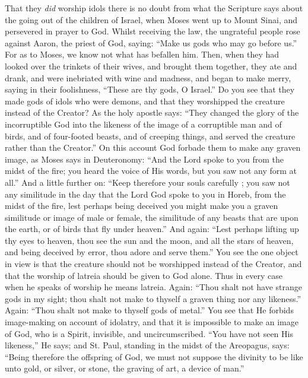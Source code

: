 \documentclass[10pt]{book}
\newcommand{\switchenglish}{\selectlanguage{english} \switchcolumn}
\begin{document}
\begin{paracol}{2}
\switchenglish

That they \emph{did} worship idols there is no 
doubt from what the Scripture says about the 
going out of the children of Israel, when Moses 
went up to Mount Sinai, and persevered in 
prayer to God. Whilst receiving the law, the 
ungrateful people rose against Aaron, the 
priest of God, saying: ``Make us gods who 
may go before us.'' For as to Moses, we know 
not what has befallen him. Then, when they 
had looked over the trinkets of their wives, and 
brought them together, they ate and drank, 
and were inebriated with wine and madness, 
and began to make merry, saying in their 
foolishness, ``These are thy gods, O Israel.''
Do you see that they made gods of idols who 
were demons, and that they worshipped the 
creature instead of the Creator? As the holy 
apostle says: ``They changed the glory of the 
incorruptible God into the likeness of the 
image of a corruptible man and of birds, and 
of four-footed beasts, and of creeping things, 
and served the creature rather than the 
Creator.'' On this account God forbade them to 
make any graven image, as Moses says in 
Deuteronomy: ``And the Lord spoke to you 
from the midst of the fire; you heard the voice 
of His words, but you saw not any form at 
all.'' And a little further on: ``Keep therefore 
your souls carefully ; you saw not any similitude
in the day that the Lord God spoke to 
you in Horeb, from the midst of the fire, lest 
perhaps being deceived you might make you 
a graven similitude or image of male or female, 
the similitude of any beasts that are upon the 
earth, or of birds that fly under heaven.''
And again: ``Lest perhaps lifting up thy eyes to 
heaven, thou see the sun and the moon, and 
all the stars of heaven, and being deceived by 
error, thou adore and serve them.''
You see the one object in view is that the creature 
should not be worshipped instead of the 
Creator, and that the worship of latreia should 
be given to God alone. Thus in every case 
when he speaks of worship he means latreia. 
Again: ``Thou shalt not have strange gods in 
my sight; thou shalt not make to thyself a 
graven thing nor any likeness.''
Again: ``Thou shalt not make to thyself gods of metal.''
You see that He forbids image-making on 
account of idolatry, and that it is impossible 
to make an image of God, who is a Spirit, 
invisible, and uncircumscribed. ``You have 
not seen His likeness,'' He says; and St. Paul, 
standing in the midst of the Areopagus, says: 
``Being therefore the offspring of God, we must 
not suppose the divinity to be like unto gold, 
or silver, or stone, the graving of art, a device 
of man.''


\end{paracol}
\end{document}
